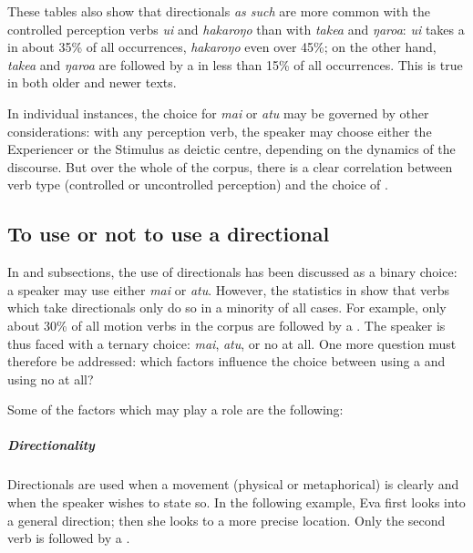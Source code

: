
These tables also show that directionals \textit{as such} are more common with the controlled perception verbs \textit{u{\ꞌ}i} and \textit{hakaroŋo} than with \textit{take{\ꞌ}a} and \textit{ŋaro{\ꞌ}a}: \textit{u{\ꞌ}i} takes a  in about 35\% of all occurrences, \textit{hakaroŋo} even over 45\%; on the other hand, \textit{take{\ꞌ}a} and \textit{ŋaro{\ꞌ}a} are followed by a  in less than 15\% of all occurrences. This is true in both older and newer texts.

\largerpage
In individual instances, the choice for \textit{mai} or \textit{atu} may be governed by other considerations: with any perception verb, the speaker may choose either the Experiencer or the Stimulus as deictic centre, depending on the dynamics of the discourse. But over the whole of the corpus, there is a clear correlation between verb type (controlled or uncontrolled perception) and the choice of .

\subsection{To use or not to use a directional}\label{sec:7.5.3}
In  and subsections, the use of directionals has been discussed as a binary choice: a speaker may use either \textit{mai} or \textit{atu}. However, the statistics in  show that verbs which take directionals only do so in a minority of all cases. For example, only about 30\% of all motion verbs in the corpus are followed by a . The speaker is thus faced with a ternary choice: \textit{mai}, \textit{atu}, or no  at all. One more question must therefore be addressed: which factors influence the choice between using a  and using no  at all?

Some of the factors which may play a role are the following:

\subparagraph{Directionality} Directionals are used when a movement (physical or metaphorical) is clearly  and when the speaker wishes to state so. In the following example, Eva first looks into a general direction; then she looks to a more precise location. Only the second verb is followed by a .

